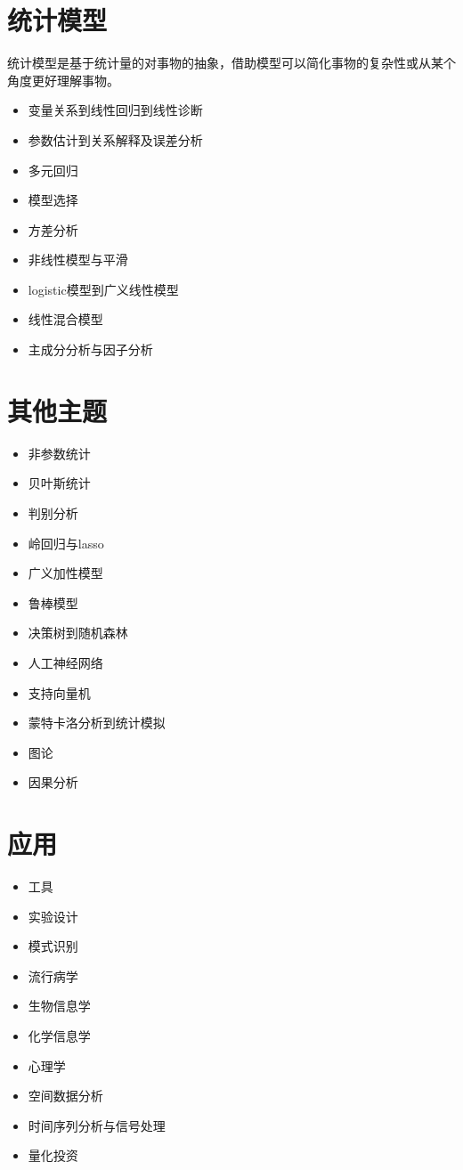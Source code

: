 \documentclass[]{book}
\providecommand{\tightlist}{%
  \setlength{\itemsep}{0pt}\setlength{\parskip}{0pt}}
\begin{document}
\hypertarget{sm}{%
\section{统计模型}\label{sm}}

统计模型是基于统计量的对事物的抽象，借助模型可以简化事物的复杂性或从某个角度更好理解事物。

\begin{itemize}
\tightlist
\item
  变量关系到线性回归到线性诊断
\item
  参数估计到关系解释及误差分析
\item
  多元回归
\item
  模型选择
\item
  方差分析
\item
  非线性模型与平滑
\item
  logistic模型到广义线性模型
\item
  线性混合模型
\item
  主成分分析与因子分析
\end{itemize}

\section{其他主题}

\begin{itemize}
\tightlist
\item
  非参数统计
\item
  贝叶斯统计
\item
  判别分析
\item
  岭回归与lasso
\item
  广义加性模型
\item
  鲁棒模型
\item
  决策树到随机森林
\item
  人工神经网络
\item
  支持向量机
\item
  蒙特卡洛分析到统计模拟
\item
  图论
\item
  因果分析
\end{itemize}

\section{应用}

\begin{itemize}
\tightlist
\item
  工具
\item
  实验设计
\item
  模式识别
\item
  流行病学
\item
  生物信息学
\item
  化学信息学
\item
  心理学
\item
  空间数据分析
\item
  时间序列分析与信号处理
\item
  量化投资
\end{itemize}
\end{document}
